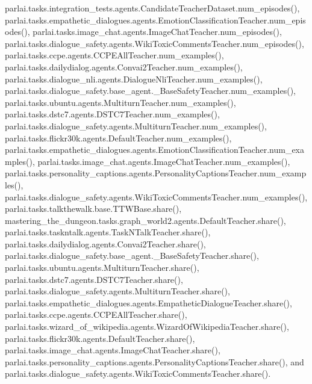 parlai.\+tasks.\+integration\+\_\+tests.\+agents.\+Candidate\+Teacher\+Dataset.\+num\+\_\+episodes(), parlai.\+tasks.\+empathetic\+\_\+dialogues.\+agents.\+Emotion\+Classification\+Teacher.\+num\+\_\+episodes(), parlai.\+tasks.\+image\+\_\+chat.\+agents.\+Image\+Chat\+Teacher.\+num\+\_\+episodes(), parlai.\+tasks.\+dialogue\+\_\+safety.\+agents.\+Wiki\+Toxic\+Comments\+Teacher.\+num\+\_\+episodes(), parlai.\+tasks.\+ccpe.\+agents.\+C\+C\+P\+E\+All\+Teacher.\+num\+\_\+examples(), parlai.\+tasks.\+dailydialog.\+agents.\+Convai2\+Teacher.\+num\+\_\+examples(), parlai.\+tasks.\+dialogue\+\_\+nli.\+agents.\+Dialogue\+Nli\+Teacher.\+num\+\_\+examples(), parlai.\+tasks.\+dialogue\+\_\+safety.\+base\+\_\+agent.\+\_\+\+Base\+Safety\+Teacher.\+num\+\_\+examples(), parlai.\+tasks.\+ubuntu.\+agents.\+Multiturn\+Teacher.\+num\+\_\+examples(), parlai.\+tasks.\+dstc7.\+agents.\+D\+S\+T\+C7\+Teacher.\+num\+\_\+examples(), parlai.\+tasks.\+dialogue\+\_\+safety.\+agents.\+Multiturn\+Teacher.\+num\+\_\+examples(), parlai.\+tasks.\+flickr30k.\+agents.\+Default\+Teacher.\+num\+\_\+examples(), parlai.\+tasks.\+empathetic\+\_\+dialogues.\+agents.\+Emotion\+Classification\+Teacher.\+num\+\_\+examples(), parlai.\+tasks.\+image\+\_\+chat.\+agents.\+Image\+Chat\+Teacher.\+num\+\_\+examples(), parlai.\+tasks.\+personality\+\_\+captions.\+agents.\+Personality\+Captions\+Teacher.\+num\+\_\+examples(), parlai.\+tasks.\+dialogue\+\_\+safety.\+agents.\+Wiki\+Toxic\+Comments\+Teacher.\+num\+\_\+examples(), parlai.\+tasks.\+talkthewalk.\+base.\+T\+T\+W\+Base.\+share(), mastering\+\_\+the\+\_\+dungeon.\+tasks.\+graph\+\_\+world2.\+agents.\+Default\+Teacher.\+share(), parlai.\+tasks.\+taskntalk.\+agents.\+Task\+N\+Talk\+Teacher.\+share(), parlai.\+tasks.\+dailydialog.\+agents.\+Convai2\+Teacher.\+share(), parlai.\+tasks.\+dialogue\+\_\+safety.\+base\+\_\+agent.\+\_\+\+Base\+Safety\+Teacher.\+share(), parlai.\+tasks.\+ubuntu.\+agents.\+Multiturn\+Teacher.\+share(), parlai.\+tasks.\+dstc7.\+agents.\+D\+S\+T\+C7\+Teacher.\+share(), parlai.\+tasks.\+dialogue\+\_\+safety.\+agents.\+Multiturn\+Teacher.\+share(), parlai.\+tasks.\+empathetic\+\_\+dialogues.\+agents.\+Empathetic\+Dialogue\+Teacher.\+share(), parlai.\+tasks.\+ccpe.\+agents.\+C\+C\+P\+E\+All\+Teacher.\+share(), parlai.\+tasks.\+wizard\+\_\+of\+\_\+wikipedia.\+agents.\+Wizard\+Of\+Wikipedia\+Teacher.\+share(), parlai.\+tasks.\+flickr30k.\+agents.\+Default\+Teacher.\+share(), parlai.\+tasks.\+image\+\_\+chat.\+agents.\+Image\+Chat\+Teacher.\+share(), parlai.\+tasks.\+personality\+\_\+captions.\+agents.\+Personality\+Captions\+Teacher.\+share(), and parlai.\+tasks.\+dialogue\+\_\+safety.\+agents.\+Wiki\+Toxic\+Comments\+Teacher.\+share().


